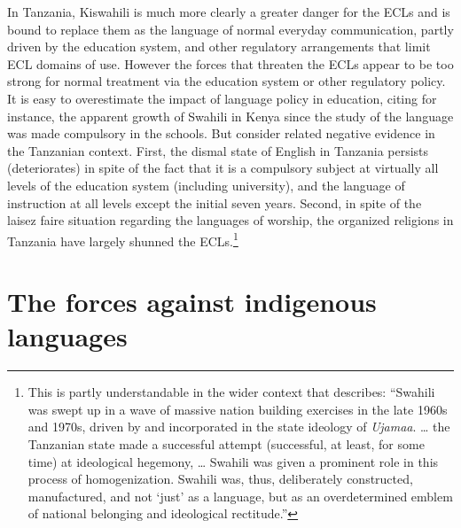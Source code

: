 \documentclass[output=paper,colorlinks,citecolor=brown]{langscibook}
\begin{document}
In Tanzania, Kiswahili is much more clearly a greater danger for the ECLs and is bound to replace them as the language of normal everyday communication, partly driven by the education system, and other regulatory arrangements that limit ECL domains of use. However the forces that threaten the ECLs appear to be too strong for normal treatment via the education system or other regulatory policy. It is easy to overestimate the impact of language policy in education, citing for instance, the apparent growth of Swahili in Kenya since the study of the language was made compulsory in the schools. But consider related negative evidence in the Tanzanian context. First, the dismal state of English in Tanzania persists (deteriorates) in spite of the fact that it is a compulsory subject at virtually all levels of the education system (including university), and the language of instruction at all levels except the initial seven years. Second, in spite of the laisez faire situation regarding the languages of worship, the organized religions in Tanzania have largely shunned the ECLs.\footnote{This is partly understandable in the wider context that \cite[8]{Blommaert2014} describes: “Swahili was swept up in a wave of massive nation building exercises in the late 1960s and 1970s, driven by and incorporated in the state ideology of \textit{Ujamaa}.  … the Tanzanian state made a successful attempt (successful, at least, for some time) at ideological hegemony, … Swahili was given a prominent role in this process of homogenization. Swahili was, thus, deliberately constructed, manufactured, and not ‘just’ as a language, but as an overdetermined emblem of national belonging and ideological rectitude.”}

\section{The forces against indigenous languages}\label{sec:kioko:6}
\end{document}
